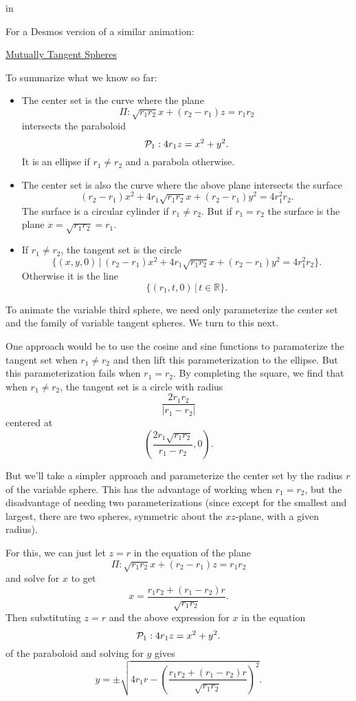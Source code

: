 \documentclass{ximera}
\newcommand{\pskip}{\vskip 0.1 in}
\begin{document}
\pskip
 
For a Desmos version of a similar animation:

\href{https://www.desmos.com/3d/7fb88aea41}{Mutually Tangent Spheres}


To summarize what we know so far:

\begin{itemize}

\item{The center set is the curve where the plane
\[
   \Pi:  \sqrt{r_1 r_2}x + (r_2 - r_1) z = r_1 r_2
\]
intersects the paraboloid
\[
  {\cal P}_1:  4r_1z = x^2 + y^2 .
\]
It is an ellipse if $r_1\neq r_2$ and a parabola otherwise.
}

\item{The center set is also the curve where the above plane intersects the surface
\[
       (r_2 - r_1)x^2 + 4 r_1\sqrt{r_1r_2}x + (r_2-r_1)y^2 =  4r_1^2 r_2 .
\]
The surface is a circular cylinder if $r_1\neq r_2$. But if $r_1=r_2$ the surface is the plane $x=\sqrt{r_1r_2} =r_1$. 
}

\item{If $r_1 \neq r_2$, the tangent set is the circle
\[
    \{ (x,y,0) \, | \,     (r_2 - r_1)x^2 + 4 r_1\sqrt{r_1r_2}x + (r_2-r_1)y^2 =  4r_1^2 r_2           \} .
\]
Otherwise it is the line 
\[
       \{ (r_1,t,0) \, | \, t\in \mathbb{R} \} .
\]
}
\end{itemize}

To animate the variable third sphere, we need only parameterize the center set and the family of variable tangent spheres. We turn to this next.

One approach would be to use the cosine and sine functions to paramaterize the tangent set when $r_1\neq r_2$ and then lift this parameterization to the ellipse. But this parameterization fails when $r_1=r_2$. By completing the square, we find that when $r_1\neq r_2$, the tangent set is a circle with radius
\[
     \frac{2r_1r_2}{|r_1 - r_2|}
\] 
centered at
\[
   \left( \frac{2r_1 \sqrt{r_1r_2}}{r_1-r_2} , 0   \right) .
\]

But we'll take a simpler approach and parameterize the center set by the radius $r$ of the variable sphere. This has the advantage of working when $r_1=r_2$, but the disadvantage of needing two parameterizations (since except for the smallest and largest, there are two spheres, symmetric about the $xz$-plane, with a given radius).

For this, we can just let $z=r$ in the equation of the plane
\[
 \Pi:  \sqrt{r_1 r_2}x + (r_2 - r_1) z = r_1 r_2
\]
and solve for $x$ to get
\[
    x = \frac{r_1r_2 +(r_1-r_2)r}{\sqrt{r_1r_2}} .
\]
Then substituting $z=r$ and the above expression for $x$ in the equation
\[
  {\cal P}_1:  4r_1z = x^2 + y^2 .
\]
of the paraboloid and solving for $y$ gives
\[
         y = \pm \sqrt{4r_1r - \left( \frac{r_1r_2 +(r_1-r_2)r}{\sqrt{r_1r_2}} \right)^2} .
\]
\end{document}
